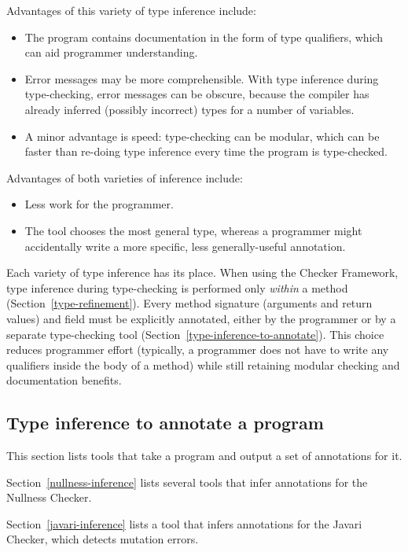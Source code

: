\begin{enumerate}
  Advantages of this variety of type inference include:
  \begin{itemize}
  \item
    The program contains documentation in the form of type qualifiers,
    which can aid programmer understanding.
  \item
    Error messages may be more comprehensible.  With type inference
    during type-checking, error messages can be obscure, because the
    compiler has already inferred (possibly incorrect) types for a number
    of variables.
  \item
    A minor advantage is speed:  type-checking can be modular, which can be
    faster than re-doing type inference every time the
    program is type-checked.
  \end{itemize}

\end{enumerate}

Advantages of both varieties of inference include:
\begin{itemize}
\item
  Less work for the programmer.
\item
  The tool chooses the most general type, whereas a programmer might
  accidentally write a more specific, less generally-useful annotation.
\end{itemize}


Each variety of type inference has its place.  When using the Checker
Framework, type inference during type-checking is performed only
\emph{within} a method (Section~\ref{type-refinement}).  Every method
signature (arguments and return values) and field must be explicitly annotated,
either by the programmer or by a separate type-checking tool
(Section~\ref{type-inference-to-annotate}).  This choice reduces programmer
effort (typically, a programmer does not have to write any qualifiers
inside the body of a method) while still retaining modular checking and
documentation benefits.


\subsection{Type inference to annotate a program\label{type-inference-to-annotate}}

This section lists tools that take a program and output a set of
annotations for it.

Section~\ref{nullness-inference} lists several tools that infer
annotations for the Nullness Checker.

Section~\ref{javari-inference} lists a tool that infers
annotations for the Javari Checker, which detects mutation errors.


